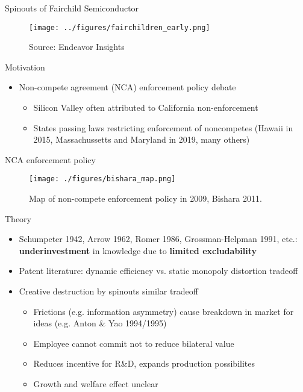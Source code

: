 \documentclass[english,usenames,dvipsnames]{beamer}
\begin{document}
\begin{frame}{Spinouts of Fairchild Semiconductor}
\begin{figure}
\texttt{[image: ../figures/fairchildren\_early.png]}
\caption{Source: Endeavor Insights}
\end{figure}
\end{frame}

\begin{frame}{Motivation}
\begin{itemize}
\item Non-compete agreement (NCA) enforcement policy debate
\begin{itemize}
\item Silicon Valley often attributed to California non-enforcement
\item States passing laws restricting enforcement of noncompetes (Hawaii in 2015, Massachussetts and Maryland in 2019, many others)
\end{itemize}
\end{itemize}
\end{frame}


\begin{frame}{NCA enforcement policy}
\begin{figure}
\texttt{[image: ./figures/bishara\_map.png]}
\caption{Map of non-compete enforcement policy in 2009, Bishara 2011.}
\end{figure}
\end{frame}


\begin{frame}{Theory}
\label{theory_big_picture}
\begin{itemize}
\item Schumpeter 1942, Arrow 1962, Romer 1986, Grossman-Helpman 1991, etc.: \textbf{\alert{underinvestment}} in knowledge due to \textbf{\alert{limited excludability}}
\item Patent literature: dynamic efficiency vs. static monopoly distortion tradeoff
\item Creative destruction by spinouts similar tradeoff
\begin{itemize}
\item Frictions (e.g. information asymmetry) cause breakdown in market for ideas (e.g. Anton \& Yao 1994/1995)
\item Employee cannot commit not to reduce bilateral value
\item Reduces incentive for R\&D, expands production possibilites
\item Growth and welfare effect unclear
\end{itemize}
\end{itemize}
\end{frame}
\end{document}
